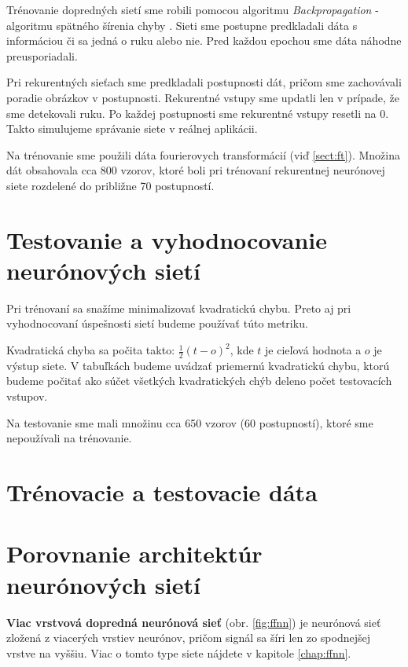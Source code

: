 {\color{red}
Trénovanie dopredných sietí sme robili pomocou algoritmu \textit{Backpropagation} - algoritmu spätného šírenia chyby \cite{haykin1999neural}. Sieti sme postupne predkladali dáta s informáciou či sa jedná o ruku alebo nie. Pred každou epochou sme dáta náhodne preusporiadali. 

Pri rekurentných sieťach sme predkladali postupnosti dát, pričom sme zachovávali poradie obrázkov v postupnosti. Rekurentné vstupy sme updatli len v prípade, že sme detekovali ruku. Po každej postupnosti sme rekurentné vstupy resetli na 0. Takto simulujeme správanie siete v reálnej aplikácii.

Na trénovanie sme použili dáta fourierovych transformácií (viď \ref{sect:ft}). Množina dát obsahovala cca 800 vzorov, ktoré boli pri trénovaní rekurentnej neurónovej siete rozdelené do približne 70 postupností.
}

\section{Testovanie a vyhodnocovanie neurónových sietí}
Pri trénovaní sa snažíme minimalizovať kvadratickú chybu. Preto aj pri vyhodnocovaní úspešnosti sietí budeme používať túto metriku.

Kvadratická chyba sa počita takto: $\frac{1}{2}(t-o)^2$, kde $t$ je cieľová hodnota a $o$ je výstup siete. V tabuľkách budeme uvádzať priemernú kvadratickú chybu, ktorú budeme počitať ako súčet všetkých kvadratických chýb deleno počet testovacích vstupov. 

Na testovanie sme mali množinu cca 650 vzorov (60 postupností), ktoré sme nepoužívali na trénovanie.

\section{Trénovacie a testovacie dáta}

\section{Porovnanie architektúr neurónových sietí}

{\color{red}
\textbf{Viac vrstvová dopredná neurónová sieť} (obr. \ref{fig:ffnn}) je neurónová sieť zložená z viacerých vrstiev neurónov, pričom signál sa šíri len zo spodnejšej vrstve na vyššiu. Viac o tomto type siete nájdete v kapitole \ref{chap:ffnn}.
}

